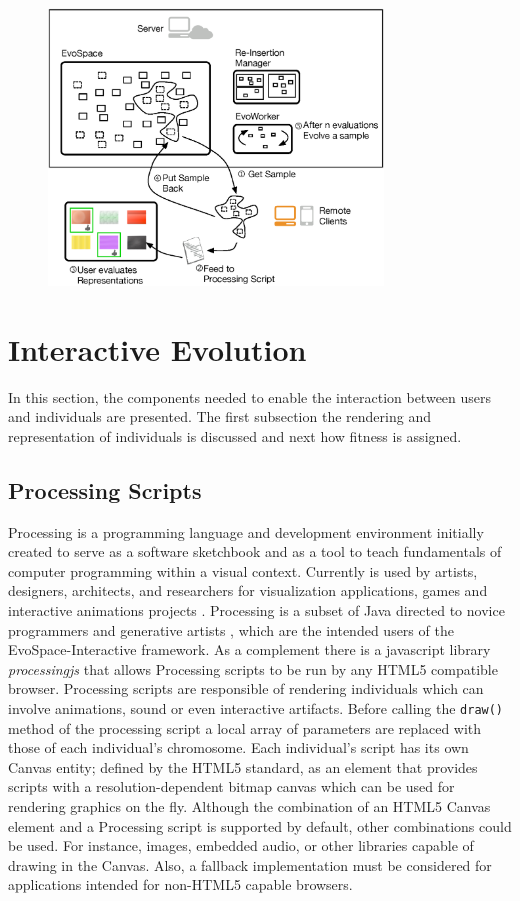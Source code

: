 \documentclass{sig-alternate}
\begin{document}
\begin{figure}[!t]
    \centering
        \includegraphics[width=3.5in]{evospaceInteractive.eps}
    \caption{}
    \label{fig:evoInteractive}
\end{figure}


\section{Interactive Evolution}
In this section, the components needed to enable the interaction between users and individuals are presented. The first subsection the rendering and representation of individuals is discussed and next how fitness is assigned.

\subsection{Processing Scripts}
Processing is a programming language and development environment initially created to serve as a software sketchbook and as a tool to teach fundamentals
of computer programming within a visual context.
Currently is used by artists, designers, architects, and researchers for visualization applications, games and interactive animations projects \cite{Reas:2007wp}.
Processing is a subset of Java directed to novice programmers and generative artists \cite{Pearson:2011ti}, which are the intended users of the EvoSpace-Interactive framework.
As a complement there is a javascript library \emph{processingjs} that allows Processing scripts to be run by any HTML5 compatible browser.
Processing scripts are responsible of rendering individuals which can involve animations, sound or even interactive artifacts.
Before calling the \texttt{draw()} method of the processing script a local array of parameters are replaced with those of each individual's chromosome.
Each individual's script has its own Canvas entity; defined by the HTML5 standard, as an element that provides scripts with a resolution-dependent bitmap canvas which can be used for rendering graphics on the fly.
Although the combination of an HTML5 Canvas element and a Processing script is supported by default, other combinations could be used.
For instance, images, embedded audio, or other libraries capable of drawing in the Canvas.
Also, a fallback implementation must be considered for applications intended for non-HTML5 capable browsers.
\end{document}
